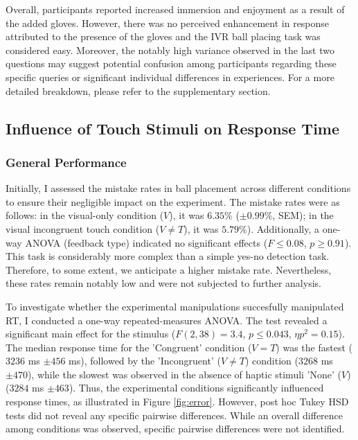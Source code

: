 \documentclass[12pt,oneside,openright]{report}
\begin{document}
Overall, participants reported increased immersion and enjoyment as a result of the added gloves. However, there was no perceived enhancement in response attributed to the presence of the gloves and the IVR ball placing task was considered easy. Moreover, the notably high variance observed in the last two questions may suggest potential confusion among participants regarding these specific queries or significant individual differences in experiences. For a more detailed breakdown, please refer to the supplementary section.
    
\subsection*{Influence of Touch Stimuli on Response Time}
\subsubsection*{General Performance}

Initially, I assessed the mistake rates in ball placement across different conditions to ensure their negligible impact on the experiment. The mistake rates were as follows: in the visual-only condition ($V$), it was $6.35\%$ ($\pm 0.99\%$, SEM); in the visual incongruent touch condition ($V \neq T$), it was $5.79\%$). Additionally, a one-way ANOVA (feedback type) indicated no significant effects ($ F \leq 0.08$, $p \geq 0.91$). This task is considerably more complex than a simple yes-no detection task. Therefore, to some extent, we anticipate a higher mistake rate. Nevertheless, these rates remain notably low and were not subjected to further analysis.

To investigate whether the experimental manipulations succesfully manipulated RT, I conducted a one-way repeated-measures ANOVA. The test revealed a significant main effect for the stimulus ($F(2,38) = 3.4$, $p \leq 0.043$, $\eta p^2 = 0.15$). The median response time for the 'Congruent' condition ($V=T$) was the fastest ($3236$ ms $\pm 456$ ms), followed by the 'Incongruent' ($V \neq T$) condition ($3268$ ms $\pm 470$), while the slowest was observed in the absence of haptic stimuli 'None' ($V$) ($3284$ ms $\pm 463$). Thus, the experimental conditions significantly influenced response times, as illustrated in Figure \ref{fig:error}. However, post hoc Tukey HSD tests did not reveal any specific pairwise differences. While an overall difference among conditions was observed, specific pairwise differences were not identified.
\end{document}
